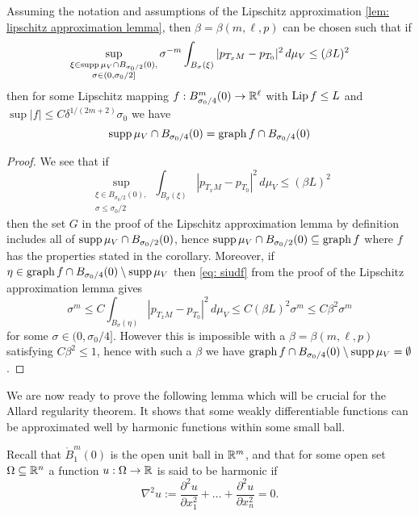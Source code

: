 \begin{corollary}\label{cor: lipschitz corollary}
Assuming the notation and assumptions of the Lipschitz approximation \cref{lem: lipschitz approximation lemma}, then $\beta = \beta(m, \ell, p)$ can be chosen such that if
\[
    \sup_{\substack{\xi \in \operatorname{supp} \mu_V \cap B_{\sigma_0/2}(0), \\ \sigma \in (0, \sigma_0/2]}} \sigma^{-m} \int_{B_{\sigma}(\xi)} |p_{T_xM}-p_{T_0}|^2\, d\mu_V \le (\beta L)^2
\]
then for some Lipschitz mapping $f:B^m_{\sigma_0/4}(0) \to \mathbb{R}^{\ell}$ with $\operatorname{Lip} f \le L$ and $\sup|f| \le C\delta^{1/(2m+2)}\sigma_0$ we have
\[
    \operatorname{supp} \mu_V \cap B_{\sigma_0/4}(0) = \operatorname{graph} f \cap B_{\sigma_0/4}(0)
\]
\end{corollary}
\begin{proof}
We see that if 
\[
    \sup_{\substack{\xi \in B_{\sigma_0/2}(0), \\ \sigma \le \sigma_0/2}}  \int_{B_{\sigma}(\xi)} |p_{T_xM}-p_{T_0}|^2\, d\mu_V \le (\beta L)^2
\]
then the set $G$ in the proof of the Lipschitz approximation lemma by definition includes all of $\operatorname{supp} \mu_V \cap B_{\sigma_0/2}(0)$, hence $\operatorname{supp} \mu_V \cap B_{\sigma_0/2}(0) \subseteq \operatorname{graph} f$ where $f$ has the properties stated in the corollary. Moreover, if $\eta \in \operatorname{graph} f \cap B_{\sigma_0/4}(0) \setminus \operatorname{supp} \mu_V$ then \eqref{eq: siudf} from the proof of the Lipschitz approximation lemma gives
\[
    \sigma^m \le C \int_{B_{\sigma}(\eta)} |p_{T_xM} - p_{T_0}|^2 \, d\mu_V \le C(\beta L)^2\sigma^m \le C\beta^2\sigma^m
\]
for some $\sigma \in (0,\sigma_0/4]$. However this is impossible with a $\beta = \beta(m, \ell, p)$ satisfying $C\beta^2 \le 1$, hence with such a $\beta$ we have $\operatorname{graph} f \cap B_{\sigma_0/4}(0) \setminus \operatorname{supp} \mu_V = \emptyset$.
\end{proof}

We are now ready to prove the following lemma which will be crucial for the Allard regularity theorem. It shows that some weakly differentiable functions can be approximated well by harmonic functions within some small ball.

Recall that $\mathring{B}_1^m(0)$ is the open unit ball in $\mathbb{R}^m$, and that for some open set $\Omega \subseteq \mathbb{R}^n$ a function $u:\Omega \to \mathbb{R}$ is said to be harmonic if
\[
    \nabla^2 u := \frac{\partial^2 u}{\partial x_1^2} + \dots + \frac{\partial^2 u}{\partial x_n^2} = 0.
\]

